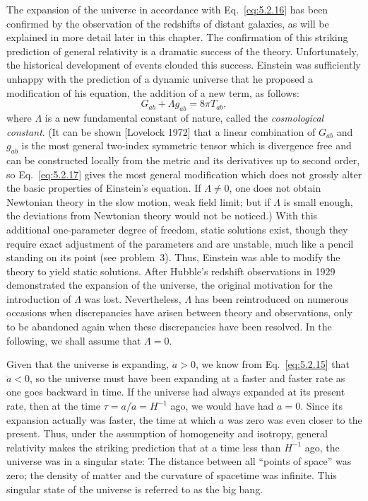 The expansion of the universe in accordance with Eq.~\eqref{eq:5.2.16} has been
confirmed by the observation of the redshifts of distant galaxies, as will be explained
in more detail later in this chapter. The confirmation of this striking prediction of
general relativity is a dramatic success of the theory. Unfortunately, the historical
development of events clouded this success. Einstein was sufficiently unhappy with
the prediction of a dynamic universe that he proposed a modification of his equation,
the addition of a new term, as follows:
\begin{equation}
  G_{ab}+\Lambda g_{ab}=8\pi T_{ab},
  \tag{5.2.17}\label{eq:5.2.17}
\end{equation}
where \(\Lambda\) is a new fundamental constant of nature, called the
\emph{cosmological constant}. (It can be shown [Lovelock 1972] that a linear
combination of \(G_{ab}\) and \(g_{ab}\) is the most general two-index symmetric
tensor which is divergence free and can be constructed locally from the metric and
its derivatives up to second order, so Eq.~\eqref{eq:5.2.17} gives the most general
modification which does not grossly alter the basic properties of Einstein's equation.
If \(\Lambda\ne0\), one does not obtain Newtonian theory in the slow motion, weak
field limit; but if \(\Lambda\) is small enough, the deviations from Newtonian theory
would not be noticed.) With this additional one-parameter degree of freedom, static
solutions exist, though they require exact adjustment of the parameters and are
unstable, much like a pencil standing on its point (see problem~3). Thus, Einstein was
able to modify the theory to yield static solutions. After Hubble's redshift
observations in 1929 demonstrated the expansion of the universe, the original
motivation for the introduction of \(\Lambda\) was lost. Nevertheless, \(\Lambda\) has
been reintroduced on numerous occasions when discrepancies have arisen between
theory and observations, only to be abandoned again when these discrepancies have
been resolved. In the following, we shall assume that \(\Lambda=0\).

Given that the universe is expanding, \(\dot a>0\), we know from
Eq.~\eqref{eq:5.2.15} that \(\ddot a<0\), so the universe must have been expanding
at a faster and faster rate as one goes backward in time. If the universe had always
expanded at its present rate, then at the time \(\tau=a/\dot a=H^{-1}\) ago, we
would have had \(a=0\). Since its expansion actually was faster, the time at which
\(a\) was zero was even closer to the present. Thus, under the assumption of
homogeneity and isotropy, general relativity makes the striking prediction that at a
time less than \(H^{-1}\) ago, the universe was in a singular state: The distance
between all ``points of space'' was zero; the density of matter and the curvature of
spacetime was infinite. This singular state of the universe is referred to as the big
bang.

